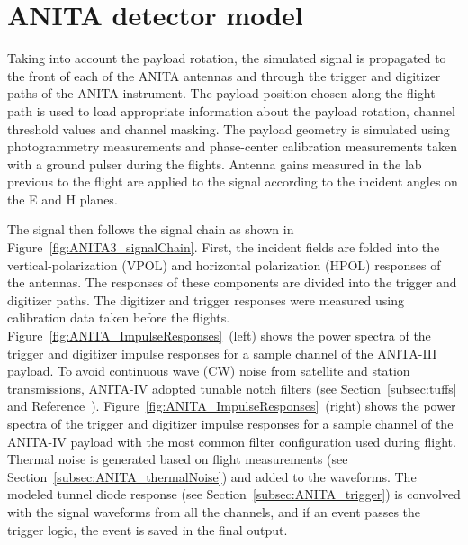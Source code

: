 \section{ANITA detector model}
\label{sec:ANITA}
Taking into account the payload rotation, the simulated signal is
propagated to the front of each of the ANITA antennas and through the trigger and digitizer paths of the ANITA instrument.
The payload position chosen along the flight path is used to load appropriate information about the payload rotation, channel threshold values and channel masking.
The payload geometry is simulated using photogrammetry measurements
and phase-center calibration measurements taken with a ground pulser
during the flights.
Antenna gains measured in the lab previous to the flight are
applied to the signal according to the incident angles on the E and H planes. 

The signal then follows the signal chain as shown in
Figure~\ref{fig:ANITA3_signalChain}.
First, the incident fields are folded into the vertical-polarization (VPOL) and horizontal polarization (HPOL) responses of the antennas. 
The responses of these components are divided into the trigger and digitizer paths.
The digitizer and trigger responses were measured using calibration data taken before
the flights. 
Figure~\ref{fig:ANITA_ImpulseResponses}~(left) shows the
power spectra of the trigger and digitizer impulse responses for a
sample channel of the ANITA-III payload.
To avoid continuous wave (CW) noise from satellite and station transmissions, ANITA-IV adopted 
tunable notch filters (see Section~\ref{subsec:tuffs} and Reference~\cite{Allison:2017vtk}).
Figure~\ref{fig:ANITA_ImpulseResponses}~(right) shows the
power spectra of the trigger and digitizer impulse responses for a
sample channel of the ANITA-IV payload with the most common filter configuration used during flight.
Thermal noise is generated based on flight measurements (see Section~\ref{subsec:ANITA_thermalNoise}) and added to the waveforms.
The modeled tunnel diode response (see Section~\ref{subsec:ANITA_trigger}) is convolved with the signal waveforms from all the channels, and if an event passes the trigger logic, the event is saved in the final output.

